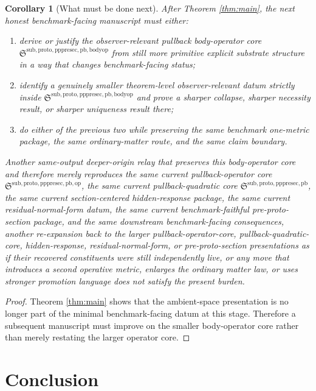 \documentclass[11pt]{article}
\newcommand{\PrePreProtoSectionPullbackCore}{\mathfrak S^{\mathrm{sub,proto,pppresec,pb}}}
\newcommand{\PullbackOperatorCore}{\mathfrak S^{\mathrm{sub,proto,pppresec,pb,op}}}
\newcommand{\PullbackBodyOperatorCore}{\mathfrak S^{\mathrm{sub,proto,pppresec,pb,bodyop}}}
\newtheorem{corollary}{Corollary}
\begin{document}
\begin{corollary}[What must be done next]
\label{cor:next}
After Theorem \ref{thm:main}, the next honest benchmark-facing manuscript must either:
\begin{enumerate}
    \item derive or justify the observer-relevant pullback body-operator core \(\PullbackBodyOperatorCore\) from still more primitive explicit substrate structure in a way that changes benchmark-facing status;
    \item identify a genuinely smaller theorem-level observer-relevant datum strictly inside \(\PullbackBodyOperatorCore\) and prove a sharper collapse, sharper necessity result, or sharper uniqueness result there;
    \item do either of the previous two while preserving the same benchmark one-metric package, the same ordinary-matter route, and the same claim boundary.
\end{enumerate}
Another same-output deeper-origin relay that preserves this body-operator core and therefore merely reproduces the same current pullback-operator core \(\PullbackOperatorCore\), the same current pullback-quadratic core \(\PrePreProtoSectionPullbackCore\), the same current section-centered hidden-response package, the same current residual-normal-form datum, the same current benchmark-faithful pre-proto-section package, and the same downstream benchmark-facing consequences, another re-expansion back to the larger pullback-operator-core, pullback-quadratic-core, hidden-response, residual-normal-form, or pre-proto-section presentations as if their recovered constituents were still independently live, or any move that introduces a second operative metric, enlarges the ordinary matter law, or uses stronger promotion language does not satisfy the present burden.
\end{corollary}

\begin{proof}
Theorem \ref{thm:main} shows that the ambient-space presentation is no longer part of the minimal benchmark-facing datum at this stage. Therefore a subsequent manuscript must improve on the smaller body-operator core rather than merely restating the larger operator core.
\end{proof}

\section{Conclusion}
\end{document}
